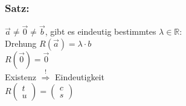 \subsubsection{Satz:}
$\vec{a} \neq \vec{0} \neq \vec{b}$, gibt es eindeutig bestimmtes $\lambda \in \mathbb{R}:$\\
Drehung $ R(\vec{a})=\lambda \cdot b$\\
$R(\vec{0})=\vec{0}$\\
%
%
%
%
Existenz $\mathop{\Rightarrow}\limits^{\text{!}}$ Eindeutigkeit\\
$R\begin{pmatrix} t \\ u \end{pmatrix} = \begin{pmatrix} c \\ s \end{pmatrix}$\\
